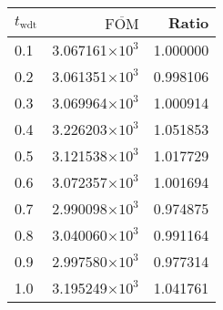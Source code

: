 \begin{tabular}{lrr}
\toprule
$t_{\mathrm{wdt}}$ & $\overline{\mathrm{FOM}}$ &    Ratio \\
\midrule
               0.1 &   3.067161$\times 10^{3}$ & 1.000000 \\
               0.2 &   3.061351$\times 10^{3}$ & 0.998106 \\
               0.3 &   3.069964$\times 10^{3}$ & 1.000914 \\
               0.4 &   3.226203$\times 10^{3}$ & 1.051853 \\
               0.5 &   3.121538$\times 10^{3}$ & 1.017729 \\
               0.6 &   3.072357$\times 10^{3}$ & 1.001694 \\
               0.7 &   2.990098$\times 10^{3}$ & 0.974875 \\
               0.8 &   3.040060$\times 10^{3}$ & 0.991164 \\
               0.9 &   2.997580$\times 10^{3}$ & 0.977314 \\
               1.0 &   3.195249$\times 10^{3}$ & 1.041761 \\
\bottomrule
\end{tabular}
